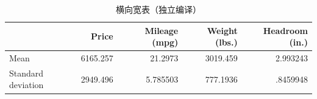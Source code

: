 \documentclass[UTF8]{ctexart}
\begin{document}
\begin{landscape}
\begin{table}[htbp]
  \centering
  \caption{ 横向宽表（独立编译） }
  \label{tab:statland}
  \small
  \begin{tabular}{lllll}
    \toprule
    \multicolumn{1}{c}{} &
      \multicolumn{1}{r}{Price} &
      \multicolumn{1}{r}{Mileage (mpg)} &
      \multicolumn{1}{r}{Weight (lbs.)} &
      \multicolumn{1}{r}{Headroom (in.)} \\
    \midrule
    \multicolumn{1}{l}{Mean} &
      \multicolumn{1}{r}{6165.257} &
      \multicolumn{1}{r}{21.2973} &
      \multicolumn{1}{r}{3019.459} &
      \multicolumn{1}{r}{2.993243} \\
    \multicolumn{1}{l}{Standard deviation} &
      \multicolumn{1}{r}{2949.496} &
      \multicolumn{1}{r}{5.785503} &
      \multicolumn{1}{r}{777.1936} &
      \multicolumn{1}{r}{.8459948} \\
    \bottomrule
  \end{tabular}
\end{table}
\end{landscape}
\end{document}
